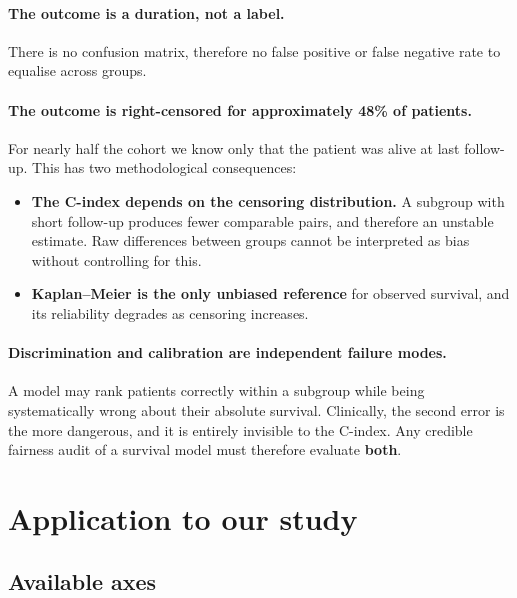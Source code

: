 \documentclass[11pt,a4paper]{article}
\begin{document}
\paragraph{The outcome is a duration, not a label.}
There is no confusion matrix, therefore no false positive or false negative rate to equalise
across groups.

\paragraph{The outcome is right-censored for approximately 48\% of patients.}
For nearly half the cohort we know only that the patient was alive at last follow-up. This has
two methodological consequences:

\begin{itemize}[leftmargin=*]
  \item \textbf{The C-index depends on the censoring distribution.} A subgroup with short
        follow-up produces fewer comparable pairs, and therefore an unstable estimate. Raw
        differences between groups cannot be interpreted as bias without controlling for this.
  \item \textbf{Kaplan--Meier is the only unbiased reference} for observed survival, and its
        reliability degrades as censoring increases.
\end{itemize}

\paragraph{Discrimination and calibration are independent failure modes.}
A model may rank patients correctly within a subgroup while being systematically wrong about
their absolute survival. Clinically, the second error is the more dangerous, and it is entirely
invisible to the C-index. Any credible fairness audit of a survival model must therefore
evaluate \textbf{both}.

\section{Application to our study}

\subsection{Available axes}
\end{document}
